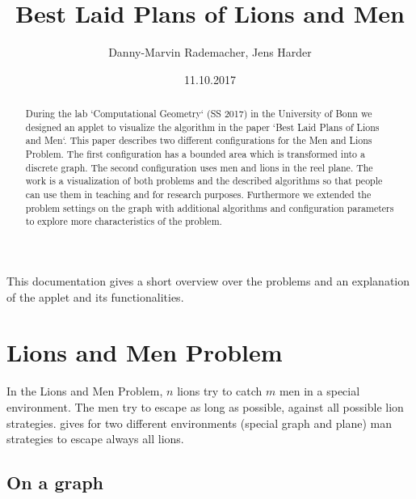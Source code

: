 \documentclass[a4paper]{article}
\title{Best Laid Plans of Lions and Men}
\author{Danny-Marvin Rademacher, Jens Harder}
\date{11.10.2017}
\begin{document}
\maketitle



\begin{abstract}
During the lab `Computational Geometry` (SS 2017) in the University of Bonn we designed an applet to visualize
the algorithm in the paper `Best Laid Plans of Lions and Men`. This paper describes two different configurations for the Men and Lions Problem. The first configuration has a bounded area which is transformed into a discrete graph. The second configuration uses men and lions in the reel plane. The work is a visualization of both problems and the described algorithms so that people can use them in teaching and for research purposes. Furthermore we extended the problem settings on the graph with additional algorithms and configuration parameters to explore more characteristics of the problem.
\end{abstract}



This documentation gives a short overview over the problems and an explanation of the applet and its functionalities.

\section{Lions and Men Problem}

In the Lions and Men Problem, $n$ lions try to catch $m$ men in a special environment. The men try to escape as long as possible, against all possible lion strategies. \cite{paper} gives for two different environments (special graph and plane) man strategies to escape always all lions.

\subsection{On a graph}
\end{document}

